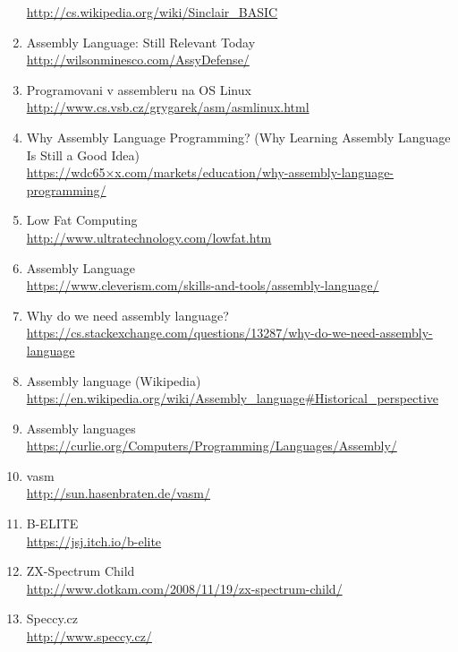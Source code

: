 \documentclass{article}
\begin{document}
\begin{enumerate}
  \href{http://cs.wikipedia.org/wiki/Sinclair_BASIC}{http://cs.wikipedia.org/wi­ki/Sinclair\_BASIC}
\item
  Assembly Language: Still Relevant Today\\
  \url{http://wilsonminesco.com/AssyDefense/}
\item
  Programovani v assembleru na OS Linux\\
  \href{http://www.cs.vsb.cz/grygarek/asm/asmlinux.html}{http://www.cs.vsb.cz/gryga­rek/asm/asmlinux.html}
\item
  Why Assembly Language Programming? (Why Learning Assembly Language Is
  Still a Good Idea)\\
  \href{https://wdc65xx.com/markets/education/why-assembly-language-programming/}{https://wdc65×x.com/market­s/education/why-assembly-language-programming/}
\item
  Low Fat Computing\\
  \href{http://www.ultratechnology.com/lowfat.htm}{http://www.ultratechnology­.com/lowfat.htm}
\item
  Assembly Language\\
  \url{https://www.cleverism.com/skills-and-tools/assembly-language/}
\item
  Why do we need assembly language?\\
  \href{https://cs.stackexchange.com/questions/13287/why-do-we-need-assembly-language}{https://cs.stackexchange.com/qu­estions/13287/why-do-we-need-assembly-language}
\item
  Assembly language (Wikipedia)\\
  \href{https://en.wikipedia.org/wiki/Assembly_language\#Historical_perspective}{https://en.wikipedia.org/wi­ki/Assembly\_language\#Histo­rical\_perspective}
\item
  Assembly languages\\
  \href{https://curlie.org/Computers/Programming/Languages/Assembly/}{https://curlie.org/Computer­s/Programming/Languages/As­sembly/}
\item
  vasm\\
  \url{http://sun.hasenbraten.de/vasm/}
\item
  B-ELITE\\
  \url{https://jsj.itch.io/b-elite}
\item
  ZX-Spectrum Child\\
  \url{http://www.dotkam.com/2008/11/19/zx-spectrum-child/}
\item
  Speccy.cz\\
  \url{http://www.speccy.cz/}

\end{enumerate}
\end{document}
